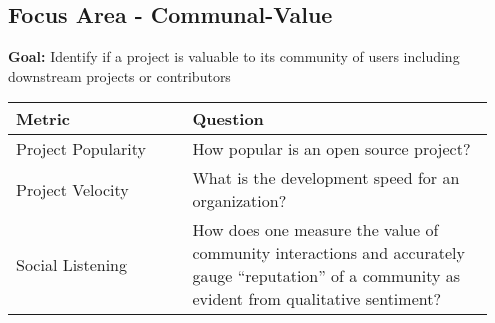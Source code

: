 
\subsection{Focus Area - Communal-Value}
\textbf{Goal:} Identify if a project is valuable to its community of users including downstream projects or contributors
\begin{table}[ht!]
    \centering
    \begin{tabular}{|p{0.35\linewidth} | p{0.6\linewidth}|}
        \hline
        \hfil \textbf{Metric}  & \hfil \textbf{Question} \\
        \hline
		Project Popularity & How popular is an open source project? \\ 
		\hline
		Project Velocity & What is the development speed for an organization? \\ 
		\hline
		Social Listening & How does one measure the value of community interactions and accurately gauge “reputation” of a community as evident from qualitative sentiment? \\ 
		\hline
    \end{tabular}
\end{table}

 
 
 
